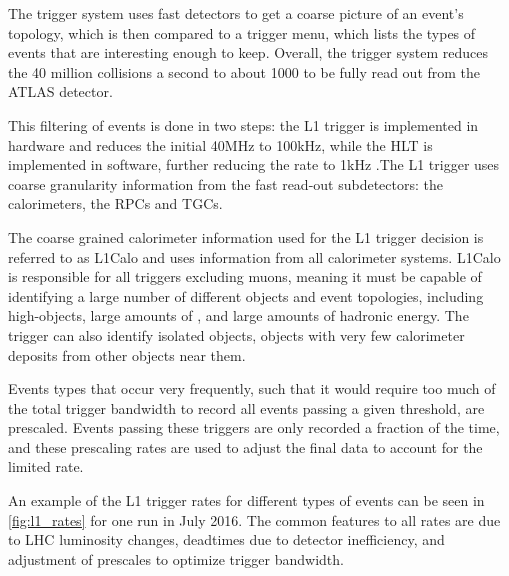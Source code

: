 The trigger system uses fast detectors to get a coarse picture of an event's topology, which is then compared to a trigger menu, which lists the types of events that are interesting enough to keep. Overall, the trigger system reduces the 40 million collisions a second to about 1000 to be fully read out from the ATLAS detector. 

This filtering of events is done in two steps: the \ac{L1} trigger is implemented in hardware and reduces the initial 40MHz to 100kHz, while the \ac{HLT} is implemented in software, further reducing the rate to 1kHz \cite{ATL-DAQ-PUB-2016-001}.The \ac{L1} trigger uses coarse granularity information from the fast read-out subdetectors: the calorimeters, the \acp{RPC} and \acp{TGC}. 

The coarse grained calorimeter information used for the \ac{L1} trigger decision is referred to as \ac{L1Calo} and uses information from all calorimeter systems. \ac{L1Calo} is responsible for all triggers excluding muons, meaning it must be capable of identifying a large number of different objects and event topologies, including high-\pt objects, large amounts of \met, and large amounts of hadronic energy. The trigger can also identify isolated objects, objects with very few calorimeter deposits from other objects near them.

Events types that occur very frequently, such that it would require too much of the total trigger bandwidth to record all events passing a given threshold, are prescaled. Events passing these triggers are only recorded a fraction of the time, and these prescaling rates are used to adjust the final data to account for the limited rate. 

An example of the \ac{L1} trigger rates for different types of events can be seen in \autoref{fig:l1_rates} for one run in July 2016. The common features to all rates are due to \ac{LHC} luminosity changes, deadtimes due to detector inefficiency, and adjustment of prescales to optimize trigger bandwidth.

